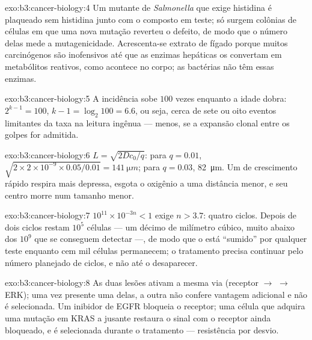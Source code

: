 \begin{solution}{exo:b3:cancer-biology:4}
Um mutante de \emph{Salmonella} que exige histidina é plaqueado sem
histidina junto com o composto em teste; só surgem colônias de células
em que uma nova mutação reverteu o defeito, de modo que o número delas
mede a mutagenicidade. Acrescenta-se extrato de fígado porque muitos
carcinógenos são inofensivos até que as enzimas hepáticas os convertam
em metabólitos reativos, como acontece no corpo; as bactérias não têm
essas enzimas.
\end{solution}

\begin{solution}{exo:b3:cancer-biology:5}
A incidência sobe $100$ vezes enquanto a idade dobra: $2^{k-1} = 100$,
$k - 1 =
\log_{2}100 = 6.6$, ou seja, cerca de sete ou oito eventos
limitantes da taxa na leitura ingênua --- menos, se a expansão clonal
entre os golpes for admitida.
\end{solution}

\begin{solution}{exo:b3:cancer-biology:6}
$L = \sqrt{2Dc_{0}/q}$: para $q = 0.01$, $\sqrt{2\times 2\times 10^{-9}
\times 0.05/0.01} = \qty{141}{\micro m}$; para $q = 0.03$,
\qty{82}{\micro m}. Um  de crescimento rápido respira mais
depressa, esgota o oxigênio a uma distância menor, e seu centro morre
num tamanho menor.
\end{solution}

\begin{solution}{exo:b3:cancer-biology:7}
$10^{11}\times 10^{-3n} < 1$ exige $n > 3.7$: quatro ciclos. Depois de
dois ciclos restam $10^{5}$ células --- um décimo de milímetro cúbico,
muito abaixo dos $10^{9}$ que se conseguem detectar ---, de modo que o
 está ``sumido'' por qualquer teste enquanto cem mil células
permanecem; o tratamento precisa continuar pelo número planejado de
ciclos, e não até o  desaparecer.
\end{solution}

\begin{solution}{exo:b3:cancer-biology:8}
As duas lesões ativam a mesma via (receptor $\to$  $\to$ ERK); uma
vez presente uma delas, a outra não confere vantagem adicional e não é
selecionada. Um inibidor de EGFR bloqueia o receptor; uma célula que
adquira uma mutação em KRAS a jusante restaura o sinal com o receptor
ainda bloqueado, e é selecionada durante o tratamento --- resistência
por desvio.
\end{solution}

